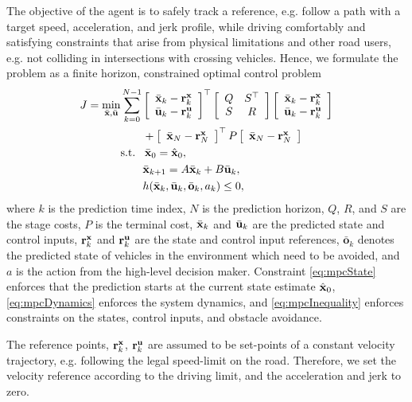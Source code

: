 The objective of the agent is to safely track a reference, e.g. follow a path with a target speed, acceleration, and jerk profile, while driving comfortably and satisfying constraints that arise from physical limitations and other road users, e.g. not colliding in intersections with crossing vehicles. Hence, we formulate  the  problem as a finite horizon, constrained optimal control problem
\begin{subequations}
	\label{eq:mpc2}
	\begin{align}
	J = \min_{\bar\x,\bar\u} & \sum_{k=0}^{N-1}%
	\matr{c}{\bar\x_k - \r_k^\x \\ \bar\u_k - \r_k^\u}^\top \matr{cc}{Q &S^\top\\S & R} \matr{c}{\bar\x_k - \r_k^\x \\ \bar\u_k - \r_k^\u} \\
	&\qquad + \matr{c}{\bar\x_N - \r_N^\x}^\top P \matr{c}{\bar\x_N - \r_N^\x}\nonumber\\
	&\text{s.t.}\ \ \, \bar\x_0 = \hat{\x}_0, \label{eq:mpcState2}\\
	&\qquad{}\bar\x_{k+1} = A\bar\x_{k}+B\bar\u_{k},\label{eq:mpcDynamics2}\\
	&\qquad{}h(\bar\x_k,\bar\u_k,\bar{\mathbf{o}}_k,a_k) \leq{} 0, \label{eq:mpcInequality2}
	\end{align}
\end{subequations}
where $k$ is  the prediction time index, $N$ is the prediction horizon, $Q$, $R$, and $S$ are the stage costs, $P$ is the terminal cost, $\bar{{\mathbf{x}}}_k$ and $ \bar{{\mathbf{u}}}_k$ are the predicted state and control inputs, ${\mathbf{r}}^{\mathbf{x}}_k$ and ${\mathbf{r}}^{\mathbf{u}}_k$ are the state and control input references, $\bar{\mathbf{o}}_k$ denotes the predicted state of vehicles in the environment which need to be avoided, and $a$ is the action from the high-level decision maker. Constraint \eqref{eq:mpcState} enforces that the prediction starts  at the current state estimate $\hat{{\mathbf{x}}}_0$, \eqref{eq:mpcDynamics} enforces the system dynamics, and \eqref{eq:mpcInequality} enforces constraints on the states, control inputs, and obstacle avoidance.

The reference points, ${\mathbf{r}}^{\mathbf{x}}_k$, ${\mathbf{r}}^{\mathbf{u}}_k$ are assumed to be set-points of a constant velocity trajectory, e.g. following the legal speed-limit on the road. Therefore, we set the velocity reference according to the driving limit, and the acceleration and jerk to zero.



